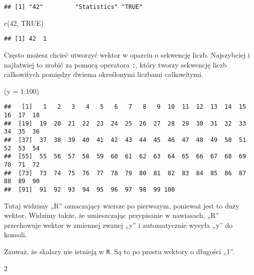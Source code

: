 \documentclass[
]{article}
\newenvironment{Shaded}{\begin{snugshade}}{\end{snugshade}}
\newcommand{\AttributeTok}[1]{\textcolor[rgb]{0.77,0.63,0.00}{#1}}
\newcommand{\ConstantTok}[1]{\textcolor[rgb]{0.00,0.00,0.00}{#1}}
\newcommand{\DecValTok}[1]{\textcolor[rgb]{0.00,0.00,0.81}{#1}}
\newcommand{\FunctionTok}[1]{\textcolor[rgb]{0.00,0.00,0.00}{#1}}
\newcommand{\NormalTok}[1]{#1}
\newcommand{\SpecialCharTok}[1]{\textcolor[rgb]{0.00,0.00,0.00}{#1}}
\begin{document}
\begin{verbatim}
## [1] "42"         "Statistics" "TRUE"
\end{verbatim}

\begin{Shaded}
\begin{Highlighting}[]
\FunctionTok{c}\NormalTok{(}\DecValTok{42}\NormalTok{, }\ConstantTok{TRUE}\NormalTok{)}
\end{Highlighting}
\end{Shaded}

\begin{verbatim}
## [1] 42  1
\end{verbatim}

Często możesz chcieć utworzyć wektor w oparciu o sekwencję liczb.
Najszybciej i najłatwiej to zrobić za pomocą operatora \texttt{:}, który
tworzy sekwencję liczb całkowitych pomiędzy dwiema określonymi liczbami
całkowitymi.

\begin{Shaded}
\begin{Highlighting}[]
\NormalTok{(}\AttributeTok{y =} \DecValTok{1}\SpecialCharTok{:}\DecValTok{100}\NormalTok{)}
\end{Highlighting}
\end{Shaded}

\begin{verbatim}
##   [1]   1   2   3   4   5   6   7   8   9  10  11  12  13  14  15  16  17  18
##  [19]  19  20  21  22  23  24  25  26  27  28  29  30  31  32  33  34  35  36
##  [37]  37  38  39  40  41  42  43  44  45  46  47  48  49  50  51  52  53  54
##  [55]  55  56  57  58  59  60  61  62  63  64  65  66  67  68  69  70  71  72
##  [73]  73  74  75  76  77  78  79  80  81  82  83  84  85  86  87  88  89  90
##  [91]  91  92  93  94  95  96  97  98  99 100
\end{verbatim}

Tutaj widzimy „R'' oznaczający wiersze po pierwszym, ponieważ jest to
duży wektor. Widzimy także, że umieszczając przypisanie w nawiasach,
„R'' przechowuje wektor w zmiennej zwanej „y'' i automatycznie wysyła
„y'' do konsoli.

Zauważ, że skalary nie istnieją w \texttt{R}. Są to po prostu wektory o
długości „1''.

\begin{Shaded}
\begin{Highlighting}[]
\DecValTok{2}
\end{Highlighting}
\end{Shaded}
\end{document}
